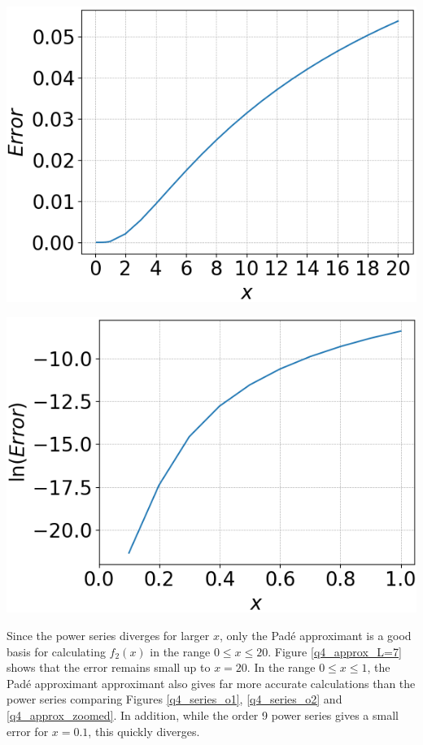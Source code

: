 \documentclass[12pt, a4paper]{article}
\begin{document}
\begin{minipage}{0.45\textwidth}
	\centering
	\includegraphics[width=\linewidth]{q4_approx_L=7}
	\label{q4_approx_L=7}
\end{minipage}
\hspace{0.9cm}
\begin{minipage}{0.48\textwidth}
	\centering
	\includegraphics[width=\linewidth]{q4_approx_zoomed}
	\label{q4_approx_zoomed}
\end{minipage}
\vspace{0.5cm}

Since the power series diverges for larger $x$, only the Pad\'e approximant is a good basis
for calculating $f_{2}(x)$ in the range $0 \leq x \leq 20$. Figure \ref{q4_approx_L=7} shows
that the error remains small up to $x=20$. In the range $0 \leq x \leq 1$, the Pad\'e approximant
approximant also gives far more accurate calculations than the power series comparing Figures
\ref{q4_series_o1}, \ref{q4_series_o2} and \ref{q4_approx_zoomed}. In addition, while the order 9
power series gives a small error for $x = 0.1$, this quickly diverges.
\\
\end{document}
